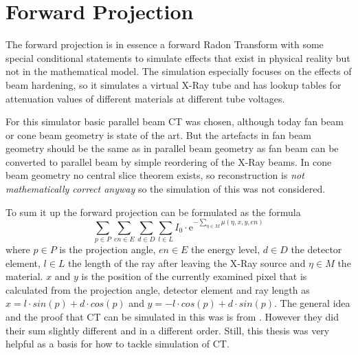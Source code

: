 \section{Forward Projection}
\par The forward projection is in essence a forward Radon Transform with some special conditional statements to simulate effects that exist in physical reality but not in the mathematical model. The simulation especially focuses on the effects of beam hardening, so it simulates a virtual X-Ray tube and has lookup tables for attenuation values of different materials at different tube voltages.
\par For this simulator basic parallel beam CT was chosen, although today fan beam or cone beam geometry is state of the art. But the artefacts in fan beam geometry should be the same as in parallel beam geometry as fan beam can be converted to parallel beam by simple reordering of the X-Ray beams.\cite{IIIP_3_4} In cone beam geometry no central slice theorem exists, so reconstruction is \emph{not mathematically correct anyway} so the simulation of this was not considered\cite{IIIP_3_5}.
\par To sum it up the forward projection can be formulated as the formula\[\sum_{p\in P}\sum_{en\in E}\sum_{d \in D}\sum_{l \in L}I_{0}\cdot \textrm{e}^{-\sum_{\eta \in M}\mu(\eta,x,y,en)}\] where \(p\in P\) is the projection angle, \(en\in E\) the energy level, \(d \in D\) the detector element, \(l \in L\) the length of the ray after leaving the X-Ray source and \(\eta \in M\) the material. \(x\) and \(y\) is the position of the currently examined pixel that is calculated from the projection angle, detector element and ray length as \(x = l\cdot sin(p) + d\cdot cos(p)\) and \(y = -l\cdot cos(p) + d\cdot sin(p)\). The general idea and the proof that CT can be simulated in this was is from \cite{deMan}. However they did their sum slightly different and in a different order. Still, this thesis was very helpful as a basis for how to tackle simulation of CT.
